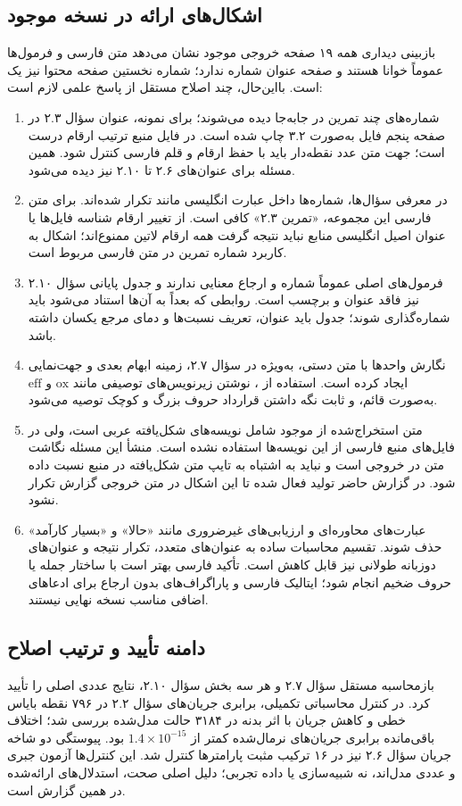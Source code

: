 \documentclass[12pt,a4paper]{article}
\newcommand{\exnum}[1]{\mbox{\beginL#1\endL}}
\begin{document}
\subsection*{اشکال‌های ارائه در نسخه موجود}
بازبینی دیداری همه ۱۹ صفحه خروجی موجود نشان می‌دهد متن فارسی و فرمول‌ها عموماً خوانا هستند و صفحه عنوان شماره ندارد؛ شماره نخستین صفحه محتوا نیز یک است. بااین‌حال، چند اصلاح مستقل از پاسخ علمی لازم است:
\begin{enumerate}
 \item شماره‌های چند تمرین در  جابه‌جا دیده می‌شوند؛ برای نمونه، عنوان سؤال \exnum{۲.۳} در صفحه پنجم فایل به‌صورت \exnum{۳.۲} چاپ شده است. در فایل منبع ترتیب ارقام درست است؛ جهت متن عدد نقطه‌دار باید با حفظ ارقام و قلم فارسی کنترل شود. همین مسئله برای عنوان‌های \exnum{۲.۶} تا \exnum{۲.۱۰} نیز دیده می‌شود.
 \item در معرفی سؤال‌ها، شماره‌ها داخل عبارت انگلیسی مانند  تکرار شده‌اند. برای متن فارسی این مجموعه، «تمرین \exnum{۲.۳}» کافی است. از تغییر ارقام شناسه فایل‌ها یا عنوان اصیل انگلیسی منابع نباید نتیجه گرفت همه ارقام لاتین ممنوع‌اند؛ اشکال به کاربرد شماره تمرین در متن فارسی مربوط است.
 \item فرمول‌های اصلی عموماً شماره و ارجاع معنایی ندارند و جدول پایانی سؤال \exnum{۲.۱۰} نیز فاقد عنوان و برچسب است. روابطی که بعداً به آن‌ها استناد می‌شود باید شماره‌گذاری شوند؛ جدول باید عنوان، تعریف نسبت‌ها و دمای مرجع یکسان داشته باشد.
 \item نگارش واحدها با متن دستی، به‌ویژه در سؤال \exnum{۲.۷}، زمینه ابهام بعدی و جهت‌نمایی ایجاد کرده است. استفاده از ، نوشتن زیرنویس‌های توصیفی مانند \(\mathrm{ox}\) و \(\mathrm{eff}\) به‌صورت قائم، و ثابت نگه داشتن قرارداد حروف بزرگ و کوچک توصیه می‌شود.
 \item متن استخراج‌شده از  موجود شامل نویسه‌های شکل‌یافته عربی است، ولی در فایل‌های منبع فارسی از این نویسه‌ها استفاده نشده است. منشأ این مسئله نگاشت متن در خروجی است و نباید به اشتباه به تایپ متن شکل‌یافته در منبع نسبت داده شود. در گزارش حاضر تولید  فعال شده تا این اشکال در متن خروجی گزارش تکرار نشود.
 \item عبارت‌های محاوره‌ای و ارزیابی‌های غیرضروری مانند «حالا» و «بسیار کارآمد» حذف شوند. تقسیم محاسبات ساده به عنوان‌های متعدد، تکرار نتیجه و عنوان‌های دو‌زبانه طولانی نیز قابل کاهش است. تأکید فارسی بهتر است با ساختار جمله یا حروف ضخیم انجام شود؛ ایتالیک فارسی و پاراگراف‌های بدون ارجاع برای ادعاهای اضافی مناسب نسخه نهایی نیستند.
\end{enumerate}

\subsection*{دامنه تأیید و ترتیب اصلاح}
بازمحاسبه مستقل سؤال \exnum{۲.۷} و هر سه بخش سؤال \exnum{۲.۱۰}، نتایج عددی اصلی را تأیید کرد. در کنترل محاسباتی تکمیلی، برابری جریان‌های سؤال \exnum{۲.۲} در ۷۹۶ نقطه بایاس خطی و کاهش جریان با اثر بدنه در ۳۱۸۴ حالت مدل‌شده بررسی شد؛ اختلاف باقی‌مانده برابری جریان‌های نرمال‌شده کمتر از \(1.4\times10^{-15}\) بود. پیوستگی دو شاخه جریان سؤال \exnum{۲.۶} نیز در ۱۶ ترکیب مثبت پارامترها کنترل شد. این کنترل‌ها آزمون جبری و عددی مدل‌اند، نه شبیه‌سازی  یا داده تجربی؛ دلیل اصلی صحت، استدلال‌های ارائه‌شده در همین گزارش است.
\end{document}
